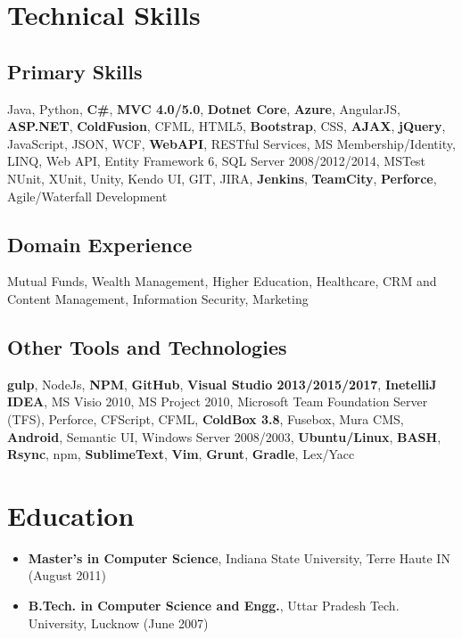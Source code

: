 \documentclass[letterpaper,10pt]{article}
\begin{document}
    \section{Technical Skills}
    \subsection{Primary Skills}
    Java, Python, \textbf{C\#}, \textbf{MVC 4.0/5.0}, \textbf{Dotnet Core}, \textbf{Azure}, AngularJS, \textbf{ASP.NET}, \textbf{ColdFusion}, CFML, HTML5, \textbf{Bootstrap}, CSS, \textbf{AJAX}, \textbf{jQuery}, JavaScript, JSON, WCF, \textbf{WebAPI}, RESTful Services, MS Membership/Identity, LINQ, Web API, Entity Framework 6, SQL Server 2008/2012/2014, MSTest NUnit, XUnit, Unity, Kendo UI, GIT, JIRA, \textbf{Jenkins}, \textbf{TeamCity}, \textbf{Perforce}, Agile/Waterfall Development

    \subsection{Domain Experience}
    Mutual Funds, Wealth Management, Higher Education, Healthcare, CRM and Content Management, Information Security, Marketing

    \subsection{Other Tools and Technologies}
    \textbf{gulp}, NodeJs, \textbf{NPM}, \textbf{GitHub}, \textbf{Visual Studio 2013/2015/2017}, \textbf{InetelliJ IDEA}, MS Visio 2010, MS Project 2010, Microsoft Team Foundation Server (TFS), Perforce, CFScript, CFML, \textbf{ColdBox 3.8}, Fusebox, Mura CMS, \textbf{Android}, Semantic UI, Windows Server 2008/2003, \textbf{Ubuntu/Linux}, \textbf{BASH}, \textbf{Rsync}, npm, \textbf{SublimeText}, \textbf{Vim}, \textbf{Grunt}, \textbf{Gradle}, Lex/Yacc

    \section{Education}
    \begin{itemize}
        \item \textbf{Master's in Computer Science}, Indiana State University, Terre Haute IN (August 2011)
        \item \textbf{B.Tech. in Computer Science and Engg.}, Uttar Pradesh Tech. University, Lucknow (June 2007)
    \end{itemize}
\end{document}
